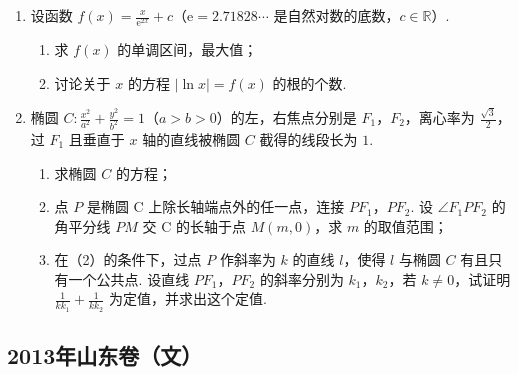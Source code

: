 \begin{description}
\begin{enumerate}[leftmargin=5pt]
        \item 设函数 \(f(x) = \frac{x}{{\mathrm{e}}^{2x}} + c\)（\({\mathrm{e}} = 2.71828\cdots\) 是自然对数的底数，\(c \in \mathbb{R}\)）.
\begin{enumerate}
\item 求 \(f(x)\) 的单调区间，最大值；
\item 讨论关于 \(x\) 的方程 \(\lvert \ln x \rvert = f(x)\) 的根的个数.
\end{enumerate}

        \item 椭圆 \(C: \frac{x^2}{a^2} + \frac{y^2}{b^2} = 1\)（\(a > b > 0\)）的左，右焦点分别是 \(F_{1}\)，\(F_{2}\)，离心率为 \(\frac{\sqrt{3}}{2}\)，过 \(F_{1}\) 且垂直于 \(x\) 轴的直线被椭圆 \(C\) 截得的线段长为 \(1\).
\begin{enumerate}
\item 求椭圆 \(C\) 的方程；
\item 点 \(P\) 是椭圆 C 上除长轴端点外的任一点，连接 \(PF_{1}\)，\(PF_{2}\). 设 \(\angle F_{1}PF_{2}\) 的角平分线 \(PM\) 交 C 的长轴于点 \(M(m,0)\)，求 \(m\) 的取值范围；
\item 在（2）的条件下，过点 \(P\) 作斜率为 \(k\) 的直线 \(l\)，使得 \(l\) 与椭圆 \(C\) 有且只有一个公共点. 设直线 \(PF_{1}\)，\(PF_{2}\) 的斜率分别为 \(k_{1}\)，\(k_{2}\)，若 \(k \neq 0\)，试证明 \(\frac{1}{kk_{1}} + \frac{1}{kk_{2}}\) 为定值，并求出这个定值.
\end{enumerate}

    \end{enumerate}

\end{description}


\subsection{2013年山东卷（文）}\label{gk:2013年山东卷（文）}

